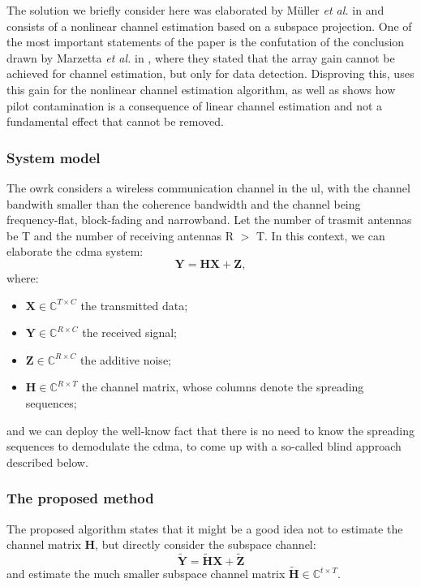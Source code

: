 \documentclass[11pt]{book}
\begin{document}
The solution we briefly consider here was elaborated by M\"uller \textit{et al.} in \cite{Ralf} and consists of a nonlinear channel estimation based on a subspace projection. One of the most important statements of the paper is the confutation of the conclusion drawn by Marzetta \textit{et al.} in \cite{Marzetta2010}, where they stated that the array gain cannot be achieved for channel estimation, but only for data detection. Disproving this, \cite{Ralf} uses this gain for the nonlinear channel estimation algorithm, as well as shows how pilot contamination is a consequence of linear channel estimation and not a fundamental effect that cannot be removed.

\subsubsection{System model}
The owrk considers a wireless communication channel in the \gls{ul}, with the channel bandwith smaller than the coherence bandwidth and the channel being frequency-flat, block-fading and narrowband. Let the number of trasmit antennas be T and the number of receiving antennas R $>$ T. In this context, we can elaborate the \gls{cdma} system:
\begin{equation}
  \mathbf{Y} = \mathbf{HX} + \mathbf{Z},
\end{equation}
where:
\begin{itemize}
  \item $\mathbf{X} \in \mathbb{C}^{T\times C}$ the transmitted data;
  \item $\mathbf{Y} \in \mathbb{C}^{R\times C}$ the received signal;
  \item $\mathbf{Z} \in \mathbb{C}^{R\times C}$ the additive noise;
  \item $\mathbf{H} \in \mathbb{C}^{R\times T}$ the channel matrix, whose columns denote the spreading sequences;
\end{itemize}
and we can deploy the well-know fact that there is no need to know the spreading sequences to demodulate the \gls{cdma}, to come up with a so-called blind approach described below.
\subsubsection{The proposed method}
The proposed algorithm states that it might be a good idea not to estimate the channel matrix $\mathbf{H}$, but directly consider the subspace channel:
\begin{equation}
  \mathbf{\tilde{Y}} = \mathbf{\tilde{H}X} + \mathbf{\tilde{Z}}
\end{equation}
and estimate the much smaller subspace channel matrix $\mathbf{\tilde{H}} \in \mathbb{C}^{t\times T}$.
\end{document}
